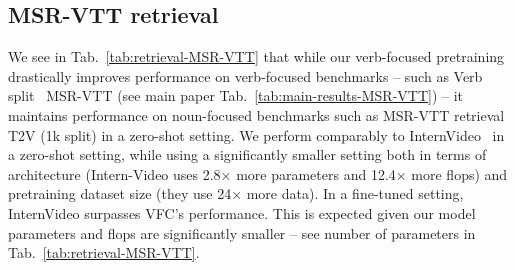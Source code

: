 \subsection{MSR-VTT retrieval}\label{subsec:app:retrieval}
We see in Tab.~\ref{tab:retrieval-MSR-VTT} that while our verb-focused pretraining drastically improves performance on verb-focused benchmarks -- such as Verb split~\cite{park-etal-2022-exposing} MSR-VTT (see main paper Tab.~\ref{tab:main-results-MSR-VTT}) -- it maintains performance on noun-focused benchmarks such as MSR-VTT retrieval T2V (1k split) in a zero-shot setting. We perform comparably to InternVideo~\cite{wang2022internvideo} in a zero-shot setting, while using a significantly smaller setting both in terms of architecture (Intern-Video uses 2.8× more parameters and 12.4× more flops) and pretraining dataset size (they use 24× more data). In a fine-tuned setting, InternVideo surpasses VFC's performance. This is expected given our model parameters and flops are significantly smaller -- see number of parameters in Tab.~\ref{tab:retrieval-MSR-VTT}.


